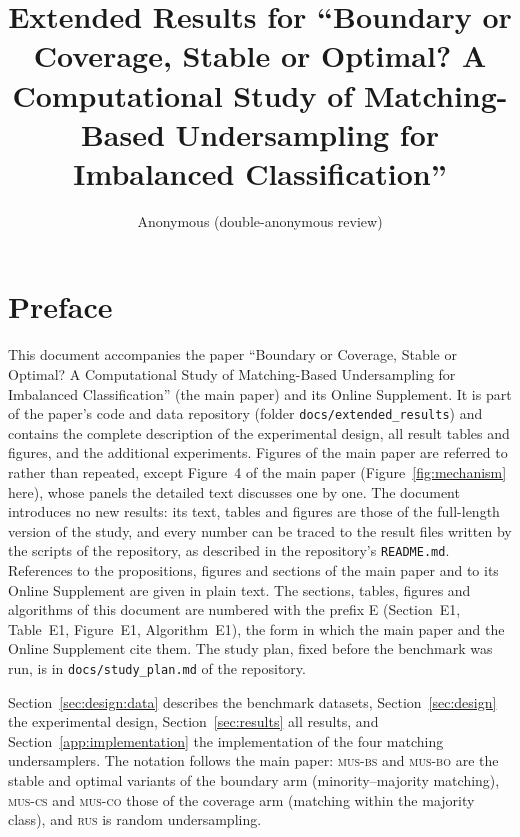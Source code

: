 \documentclass[11pt]{article}
\title{Extended Results for ``Boundary or Coverage, Stable or Optimal? A Computational Study of Matching-Based Undersampling for Imbalanced Classification''}
\author{Anonymous (double-anonymous review)}
\date{}
\newcommand{\MUSBS}{\textsc{mus-bs}}
\newcommand{\MUSBO}{\textsc{mus-bo}}
\newcommand{\MUSCS}{\textsc{mus-cs}}
\newcommand{\MUSCO}{\textsc{mus-co}}
\newcommand{\RUS}{\textsc{rus}}
\begin{document}
\maketitle

\section*{Preface}

This document accompanies the paper ``Boundary or Coverage, Stable or Optimal? A Computational Study of Matching-Based Undersampling for Imbalanced Classification'' (the main paper) and its Online Supplement. It is part of the paper's code and data repository (folder \texttt{docs/extended\_results}) and contains the complete description of the experimental design, all result tables and figures, and the additional experiments. Figures of the main paper are referred to rather than repeated, except Figure~4 of the main paper (Figure~\ref{fig:mechanism} here), whose panels the detailed text discusses one by one. The document introduces no new results: its text, tables and figures are those of the full-length version of the study, and every number can be traced to the result files written by the scripts of the repository, as described in the repository's \texttt{README.md}. References to the propositions, figures and sections of the main paper and to its Online Supplement are given in plain text. The sections, tables, figures and algorithms of this document are numbered with the prefix E (Section~E1, Table~E1, Figure~E1, Algorithm~E1), the form in which the main paper and the Online Supplement cite them. The study plan, fixed before the benchmark was run, is in \texttt{docs/study\_plan.md} of the repository.

Section~\ref{sec:design:data} describes the benchmark datasets, Section~\ref{sec:design} the experimental design, Section~\ref{sec:results} all results, and Section~\ref{app:implementation} the implementation of the four matching undersamplers. The notation follows the main paper: \MUSBS{} and \MUSBO{} are the stable and optimal variants of the boundary arm (minority--majority matching), \MUSCS{} and \MUSCO{} those of the coverage arm (matching within the majority class), and \RUS{} is random undersampling.

\tableofcontents

\clearpage


\clearpage


\clearpage


\clearpage


\clearpage


\clearpage


\end{document}
